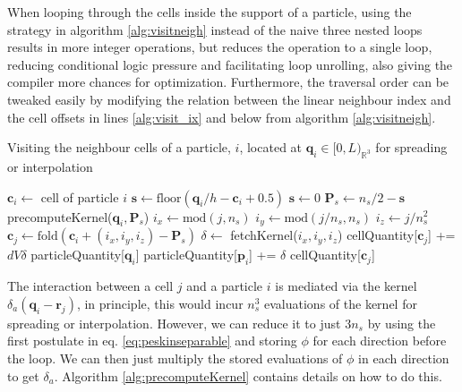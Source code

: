 \documentclass[ twoside,openright,titlepage,numbers=noenddot,%
headinclude,footinclude,cleardoublepage=empty,abstract=on,
BCOR=5mm,paper=a4,fontsize=11pt, dvipsnames
]{scrreprt}
\renewcommand{\vec}[1]{\bm{#1}}
\newcommand{\floor}{\textrm{floor}}
\newcommand{\ppos}{q}
\newcommand{\fpos}{r}
\begin{document}
When looping through the cells inside the support of a particle, using the strategy in algorithm \ref{alg:visitneigh} instead of the naive three nested loops results in more integer operations, but reduces the operation to a single loop, reducing conditional logic pressure and facilitating loop unrolling, also giving the compiler more chances for optimization. Furthermore, the traversal order can be tweaked easily by modifying the relation between the linear neighbour index and the cell offsets in lines \ref{alg:visit_ix} and below from algorithm \ref{alg:visitneigh}.
\begin{algorithm}[H]
  \caption{Visiting the neighbour cells of a particle, $i$, located at $\vec{\ppos}_i \in [0, L)_{\mathbb R ^3}$ for spreading or interpolation}
  \label{alg:visitneigh}
  \begin{algorithmic}[1]
    \State $\vec{c}_i \gets$ cell of particle $i$ \label{alg:visitneighgetcell}
    \State $\vec{s} \gets \floor(\vec{\ppos}_i/h - \vec{c}_i + 0.5)$ 
    \Else
    \State $\vec{s} \gets 0$ 
    \EndIf
    \State $\vec{P}_s\gets n_s/2 -\vec{s}$ \label{alg:visitneighshift}
    \State precomputeKernel($\vec{\ppos}_i, \vec{P}_s$) 
    \State $i_x \gets \text{mod}(j, n_s)$\label{alg:visit_ix}
    \State $i_y \gets \text{mod}(j/n_s, n_s)$
    \State $i_z \gets j/n_s^2$
    \State $\vec{c}_j \gets \text{fold}(\vec{c}_i + (i_x, i_y, i_z) - \vec{P}_s)$ \Comment{Neighbour cell $\in [0, \vec{n})$}
    \State $\delta\gets$ fetchKernel($i_x, i_y, i_z$) \Comment{$\delta_a(\vec{q}_i - \vec{c}_j)$, see alg.\ref{alg:precomputeKernel}}
    \State cellQuantity[$\vec{c}_j$] += $dV\delta$ particleQuantity[$\vec{\ppos}_i$] \label{alg:visitspread}
    \State particleQuantity[$\vec{p}_i$] += $\delta$ cellQuantity[$\vec{c}_j$]\label{alg:visitinterp}
    \EndIf
    \EndFor
  \end{algorithmic}
\end{algorithm}

The interaction between a cell $j$ and a particle $i$ is mediated via the kernel $\delta_a(\vec{\ppos}_i-\vec{\fpos}_j)$, in principle, this would incur $n_s^3$ evaluations of the kernel for spreading or interpolation. However, we can reduce it to just $3n_s$ by using the first postulate in eq. \eqref{eq:peskinseparable} and storing $\phi$ for each direction before the loop. We can then just multiply the stored evaluations of $\phi$ in each direction to get $\delta_a$. Algorithm \ref{alg:precomputeKernel} contains details on how to do this.
\end{document}
